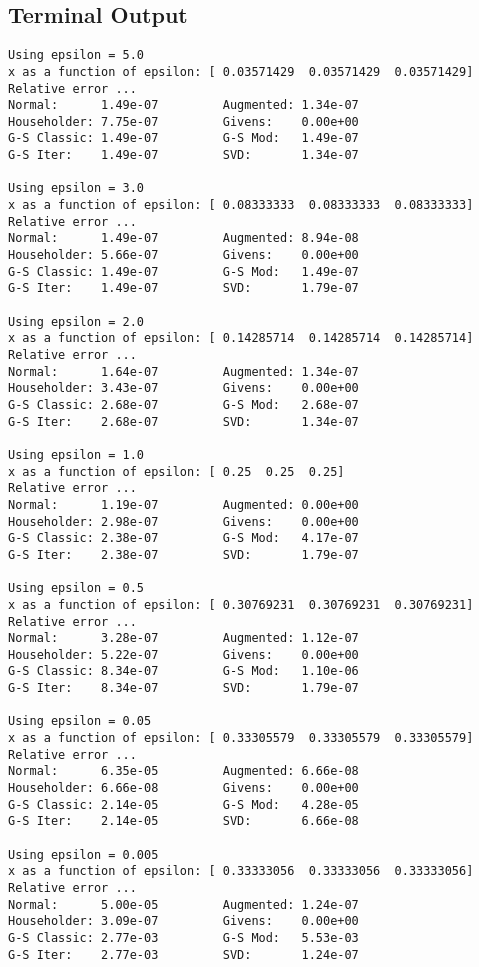 \documentclass[paper=a4, fontsize=11pt]{scrartcl}
\numberwithin{equation}{section}		%
\numberwithin{figure}{section}			%
\numberwithin{table}{section}				%
\begin{document}
\subsection{Terminal Output}
\begin{verbatim}
Using epsilon = 5.0
x as a function of epsilon: [ 0.03571429  0.03571429  0.03571429]
Relative error ...
Normal:      1.49e-07         Augmented: 1.34e-07
Householder: 7.75e-07         Givens:    0.00e+00
G-S Classic: 1.49e-07         G-S Mod:   1.49e-07
G-S Iter:    1.49e-07         SVD:       1.34e-07

Using epsilon = 3.0
x as a function of epsilon: [ 0.08333333  0.08333333  0.08333333]
Relative error ...
Normal:      1.49e-07         Augmented: 8.94e-08
Householder: 5.66e-07         Givens:    0.00e+00
G-S Classic: 1.49e-07         G-S Mod:   1.49e-07
G-S Iter:    1.49e-07         SVD:       1.79e-07

Using epsilon = 2.0
x as a function of epsilon: [ 0.14285714  0.14285714  0.14285714]
Relative error ...
Normal:      1.64e-07         Augmented: 1.34e-07
Householder: 3.43e-07         Givens:    0.00e+00
G-S Classic: 2.68e-07         G-S Mod:   2.68e-07
G-S Iter:    2.68e-07         SVD:       1.34e-07

Using epsilon = 1.0
x as a function of epsilon: [ 0.25  0.25  0.25]
Relative error ...
Normal:      1.19e-07         Augmented: 0.00e+00
Householder: 2.98e-07         Givens:    0.00e+00
G-S Classic: 2.38e-07         G-S Mod:   4.17e-07
G-S Iter:    2.38e-07         SVD:       1.79e-07

Using epsilon = 0.5
x as a function of epsilon: [ 0.30769231  0.30769231  0.30769231]
Relative error ...
Normal:      3.28e-07         Augmented: 1.12e-07
Householder: 5.22e-07         Givens:    0.00e+00
G-S Classic: 8.34e-07         G-S Mod:   1.10e-06
G-S Iter:    8.34e-07         SVD:       1.79e-07

Using epsilon = 0.05
x as a function of epsilon: [ 0.33305579  0.33305579  0.33305579]
Relative error ...
Normal:      6.35e-05         Augmented: 6.66e-08
Householder: 6.66e-08         Givens:    0.00e+00
G-S Classic: 2.14e-05         G-S Mod:   4.28e-05
G-S Iter:    2.14e-05         SVD:       6.66e-08

Using epsilon = 0.005
x as a function of epsilon: [ 0.33333056  0.33333056  0.33333056]
Relative error ...
Normal:      5.00e-05         Augmented: 1.24e-07
Householder: 3.09e-07         Givens:    0.00e+00
G-S Classic: 2.77e-03         G-S Mod:   5.53e-03
G-S Iter:    2.77e-03         SVD:       1.24e-07


\end{verbatim}
\end{document}
